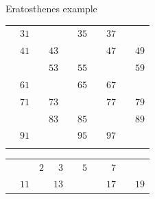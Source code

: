 \documentclass{beamer}
\begin{document}
\begin{frame}[plain]{Eratosthenes example}
{\begin{tabular}{r r r r r r r r r r}
			                   & \color{black} $31$ &                    &                    &                    & \color{black} $35$ &                    & \color{black} $37$ &                    &                   \\
			                   & \color{black} $41$ &                    & \color{black} $43$ &                    &                    &                    & \color{black} $47$ &                    & \color{black} $49$\\
			                   &                    &                    & \color{black} $53$ &                    & \color{black} $55$ &                    &                    &                    & \color{black} $59$\\
			                   & \color{black} $61$ &                    &                    &                    & \color{black} $65$ &                    & \color{black} $67$ &                    &                   \\
			                   & \color{black} $71$ &                    & \color{black} $73$ &                    &                    &                    & \color{black} $77$ &                    & \color{black} $79$\\
			                   &                    &                    & \color{black} $83$ &                    & \color{black} $85$ &                    &                    &                    & \color{black} $89$\\
			                   & \color{black} $91$ &                    &                    &                    & \color{black} $95$ &                    & \color{black} $97$ &                    &                   \\
			\phantom{$888$} & \phantom{$888$} & \phantom{$888$} & \phantom{$888$} & \phantom{$888$} & \phantom{$888$} & \phantom{$888$} & \phantom{$888$} & \phantom{$888$} & \phantom{$888$}
        \end{tabular}
	}
	 {
		\begin{tabular}{r r r r r r r r r r}
			                   &                    & \color{black}  $2$ & \color{black}  $3$ &                    & \color{ blue}  $5$ &                    & \color{black}  $7$ &                    &                   \\
			                   & \color{black} $11$ &                    & \color{black} $13$ &                    &                    &                    & \color{black} $17$ &                    & \color{black} $19$\\

\end{tabular}}
\end{frame}
\end{document}
